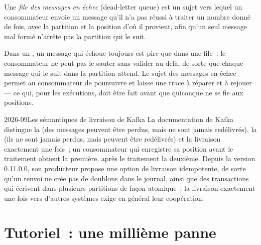 \begin{definition}\label{def:pl:messaging-and-event-driven-architecture:dlq}
Une \emph{file des messages en échec} (dead-letter queue) est un sujet vers lequel un consommateur envoie un message qu'il n'a pas réussi à traiter un nombre donné de
fois, avec la partition et la position d'où il provient, afin qu'un seul message mal formé n'arrête pas la partition qui le suit.
\end{definition}

Dans un , un message qui échoue toujours est pire que dans une file~: le consommateur ne peut pas le sauter sans valider au-delà, de sorte que chaque
message qui le suit dans la partition attend. Le sujet des messages en échec permet au consommateur de poursuivre et laisse une trace à réparer et à rejouer ---
ce qui, pour les exécutions, doit être fait avant que quiconque ne se fie aux positions.

\begin{dated}{2026-09}{Les sémantiques de livraison de Kafka}\label{dat:pl:messaging-and-event-driven-architecture:kafka}
La documentation de Kafka distingue la  (des messages peuvent être perdus, mais ne sont jamais redélivrés), la  (ils ne sont jamais perdus, mais peuvent être
redélivrés) et la livraison exactement une fois~; un consommateur qui enregistre sa position avant le traitement obtient la première, après le traitement la deuxième. Depuis la version
0.11.0.0, son producteur propose une option de livraison idempotente, de sorte qu'un renvoi ne crée pas de doublons dans le journal, ainsi que des transactions
qui écrivent dans plusieurs partitions de façon atomique~; la livraison exactement une fois vers d'autres systèmes exige en général leur coopération.
\end{dated}

\section{Tutoriel~: une millième panne}\label{tut:pl:messaging-and-event-driven-architecture:tut}

